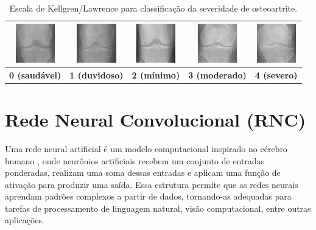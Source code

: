 \begin{table}[h]
    \centering
    \begin{tabular}{|c|c|c|c|c|}
        \hline
        \includegraphics[width=1.7cm]{figs/KL0-sample.png} & \includegraphics[width=1.7cm]{figs/KL1-sample.png} & \includegraphics[width=1.7cm]{figs/KL2-sample.png} & \includegraphics[width=1.7cm]{figs/KL3-sample.png} & \includegraphics[width=1.7cm]{figs/KL4-sample.png} \\
        \hline
        \textbf{0 (saudável)} & \textbf{1 (duvidoso)} & \textbf{2 (mínimo)} & \textbf{3 (moderado)} & \textbf{4 (severo)} \\
        \hline
    \end{tabular}
    \caption{Escala de Kellgren/Lawrence para classificação da severidade de osteoartrite.}
    \label{tabela-kl}
\end{table}

\section{Rede Neural Convolucional (RNC)}\label{sec:rnc}

Uma rede neural artificial é um modelo computacional inspirado no cérebro humano \citep{McCulloch1943}, onde neurônios artificiais recebem um conjunto de entradas ponderadas, realizam uma soma dessas entradas e aplicam uma função de ativação para produzir uma saída. Essa estrutura permite que as redes neurais aprendam padrões complexos a partir de dados, tornando-as adequadas para tarefas de processamento de linguagem natural, visão computacional, entre outras aplicações.


